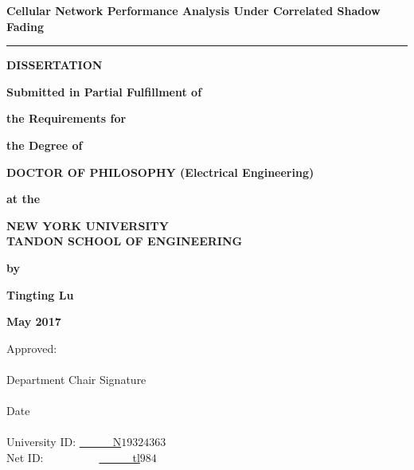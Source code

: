 \newpage
{}\baselineskip
\thispagestyle{empty}
\begin{center}
{\bf \small Cellular Network Performance Analysis Under Correlated Shadow Fading} %
 \vspace{0.1in}

\rule{2in}{0.01in}

\vspace{0.15in}

{\bf DISSERTATION}

\vspace{0.2in}

{\small \bf Submitted in Partial Fulfillment of}
\vspace{0.03in}

{\small \bf the Requirements for}
\vspace{0.03in}

{\small \bf the Degree of} \vspace{0.3in}

{\bf DOCTOR OF PHILOSOPHY (Electrical Engineering)}

\vspace{0.2in}
{\small \bf at the}
\vspace{0.1in}

{\bf NEW YORK UNIVERSITY\\
TANDON SCHOOL OF ENGINEERING} 
\vspace{0.1in}

{\small \bf by}
\vspace{0.2in}

{\bf Tingting Lu} 
\vspace{0.1in}

{\bf May 2017}
\end{center}

 \vspace{0.3in} 
 \noindent
 \makebox[3.5in]{ } {Approved:} \vspace{0.30in} \\
 \baselineskip
 \makebox[3.5in]{ } \hrulefill  \vspace{0.05in} \\
 \makebox[3.6in]{ } Department Chair Signature \vspace{0.3in} \\
 \makebox[3.5in]{ } \hrulefill \vspace{0.02in} \\
 \makebox[4.3in]{ } Date \vspace{0.1in} \\\\
University ID:   \underline{~~~~~~N$19324363\ \ \ \ \ \ \ \ $} \\
Net ID:~~~~~~~~~~\underline{~~~~~~tl$984\ \ \ \ \ \ \ \ \ \ \ \ \ \ \ \ $} 

